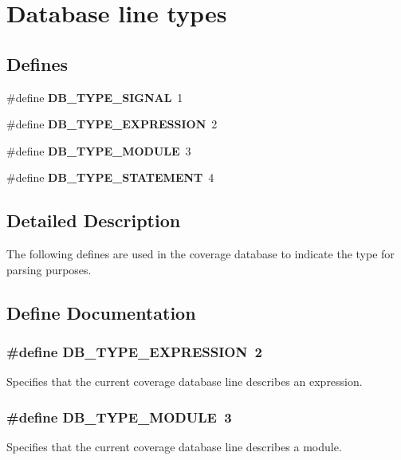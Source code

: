 \section{Database line types}
\label{group__db__types}
\subsection*{Defines}
\begin{CompactItemize}
\item 
\#define {\bf DB\_\-TYPE\_\-SIGNAL}\ 1
\item 
\#define {\bf DB\_\-TYPE\_\-EXPRESSION}\ 2
\item 
\#define {\bf DB\_\-TYPE\_\-MODULE}\ 3
\item 
\#define {\bf DB\_\-TYPE\_\-STATEMENT}\ 4
\end{CompactItemize}


\subsection{Detailed Description}
The following defines are used in the coverage database to indicate the type for parsing purposes. 

\subsection{Define Documentation}
\subsubsection{\setlength{\rightskip}{0pt plus 5cm}\#define DB\_\-TYPE\_\-EXPRESSION\ 2}\label{group__db__types_a1}


Specifies that the current coverage database line describes an expression. 
\subsubsection{\setlength{\rightskip}{0pt plus 5cm}\#define DB\_\-TYPE\_\-MODULE\ 3}\label{group__db__types_a2}


Specifies that the current coverage database line describes a module. 

